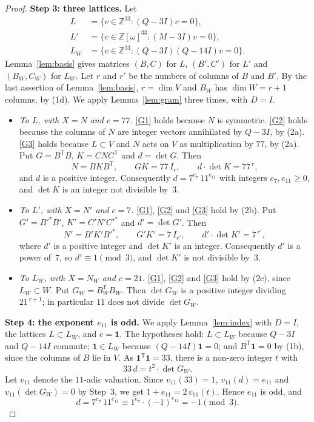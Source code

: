 \documentclass[11pt,a4paper]{article}
\theoremstyle{remark}
\newcommand{\ZZ}{\mathbb{Z}}
\newcommand{\one}{\mathbf{1}}
\newcommand{\tp}{\mathsf{T}}
\begin{document}
\begin{proof}
\medskip\noindent\textbf{Step 3: three lattices.}
Let
\begin{align*}
L&=\{v\in\ZZ^{33}:(Q-3I)v=0\},\\
L'&=\{v\in\ZZ[\omega]^{33}:(M-3I)v=0\},\\
L_W&=\{v\in\ZZ^{33}:(Q-3I)(Q-14I)v=0\}.
\end{align*}
Lemma~\ref{lem:basis} gives matrices $(B,C)$ for $L$, $(B',C')$ for $L'$ and $(B_W,C_W)$ for $L_W$. Let $r$ and
$r'$ be the numbers of columns of $B$ and $B'$. By the last assertion of Lemma~\ref{lem:basis}, $r=\dim V$ and $B_W$
has $\dim W=r+1$ columns, by (1d). We apply Lemma~\ref{lem:gram} three times, with $D=I$.
\begin{itemize}[leftmargin=*]
\item \emph{To $L$, with $X=N$ and $c=77$.} \ref{G1} holds because $N$ is symmetric. \ref{G2} holds because the
columns of $N$ are integer vectors annihilated by $Q-3I$, by (2a). \ref{G3} holds because $L\subset V$ and $N$ acts
on $V$ as multiplication by $77$, by (2a). Put $G=B^{\tp}B$, $K=CNC^{\tp}$ and $d=\det G$. Then
\begin{equation}\label{eq:free-N}
N=BKB^{\tp},\qquad GK=77\,I_r,\qquad d\cdot\det K=77^{\,r},
\end{equation}
and $d$ is a positive integer. Consequently $d=7^{e_7}\,11^{e_{11}}$ with integers $e_7,e_{11}\ge0$, and $\det K$ is
an integer not divisible by~$3$.
\item \emph{To $L'$, with $X=N'$ and $c=7$.} \ref{G1}, \ref{G2} and \ref{G3} hold by (2b). Put $G'=B'^*B'$,
$K'=C'N'C'^*$ and $d'=\det G'$. Then
\begin{equation}\label{eq:free-Np}
N'=B'K'B'^*,\qquad G'K'=7\,I_{r'},\qquad d'\cdot\det K'=7^{\,r'},
\end{equation}
where $d'$ is a positive integer and $\det K'$ is an integer. Consequently $d'$ is a power of~$7$, so
$d'\equiv1\pmod3$, and $\det K'$ is not divisible by~$3$.
\item \emph{To $L_W$, with $X=N_W$ and $c=21$.} \ref{G1}, \ref{G2} and \ref{G3} hold by (2c), since
$L_W\subset W$. Put $G_W=B_W^{\tp}B_W$. Then $\det G_W$ is a positive integer dividing $21^{\,r+1}$; in particular
$11$ does not divide $\det G_W$.
\end{itemize}

\medskip\noindent\textbf{Step 4: the exponent $e_{11}$ is odd.}
We apply Lemma~\ref{lem:index} with $D=I$, the lattices $L\subset L_W$, and $e=\one$. The hypotheses hold:
$L\subset L_W$ because $Q-3I$ and $Q-14I$ commute; $\one\in L_W$ because $(Q-14I)\one=0$; and $B^{\tp}\one=0$ by
(1b), since the columns of $B$ lie in $V$. As $\one^{\tp}\one=33$, there is a non-zero integer $t$ with
\[
33\,d=t^2\cdot\det G_W .
\]
Let $v_{11}$ denote the $11$-adic valuation. Since $v_{11}(33)=1$, $v_{11}(d)=e_{11}$ and $v_{11}(\det G_W)=0$ by
Step~3, we get $1+e_{11}=2\,v_{11}(t)$. Hence $e_{11}$ is odd, and
\[
d=7^{e_7}\,11^{e_{11}}\equiv 1^{e_7}\cdot(-1)^{e_{11}}=-1\pmod 3 .
\]


\end{proof}
\end{document}
